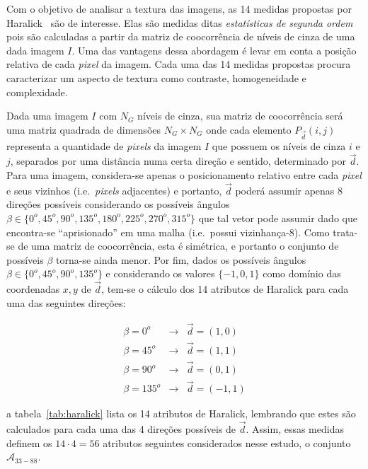 Com o objetivo de analisar a textura das imagens, as 14 medidas
propostas por Haralick~\cite{haralick} são de interesse. Elas são
medidas ditas \emph{estatísticas de segunda ordem} pois são calculadas
a partir da matriz de coocorrência de níveis de cinza de uma dada
imagem $I$. Uma das vantagens dessa abordagem é levar em conta a
posição relativa de cada \textit{pixel} da imagem. Cada uma das 14 medidas
propostas procura caracterizar um aspecto de textura como contraste,
homogeneidade e complexidade.

Dada uma imagem $I$ com $N_G$ níveis de cinza, sua matriz de
coocorrência será uma matriz quadrada de dimensões $N_G \times N_G$
onde cada elemento $P_{\vec{d}}(i,j)$ representa a quantidade
de \textit{pixels} da imagem $I$ que possuem os níveis de cinza $i$ e
$j$, separados por uma distância numa certa direção e sentido,
determinado por $\vec{d}$. Para uma imagem, considera-se apenas o
posicionamento relativo entre cada \textit{pixel} e seus vizinhos
(i.e.\ \textit{pixels} adjacentes) e portanto, $\vec{d}$ poderá
assumir apenas 8 direções possíveis considerando os possíveis ângulos
$\beta \in \{0^o, 45^o, 90^o, 135^o, 180^o, 225^o, 270^o, 315^o\}$ que
tal vetor pode assumir dado que encontra-se ``aprisionado'' em uma
malha (i.e.\ possui vizinhança-8). Como trata-se de uma matriz de
coocorrência, esta é simétrica, e portanto o conjunto de possíveis
$\beta$ torna-se ainda menor. Por fim, dados os possíveis ângulos
$\beta \in \{0^o, 45^o, 90^o, 135^o\}$ e considerando os valores
$\{-1, 0, 1\}$ como domínio das coordenadas $x,y$ de $\vec{d}$, tem-se
o cálculo dos 14 atributos de Haralick para cada uma das seguintes
direções:

\begin{eqnarray}
  \beta = 0^o & \to & \vec{d} = (1, 0) \\
  \beta = 45^o & \to & \vec{d} = (1, 1) \\
  \beta = 90^o & \to & \vec{d} = (0, 1) \\
  \beta = 135^o & \to & \vec{d} = (-1, 1)
\end{eqnarray}

\noindent a tabela~\ref{tab:haralick} lista os 14 atributos de Haralick,
lembrando que estes são calculados para cada uma das 4 direções possíveis de
$\vec{d}$. Assim, essas medidas definem os $14 \cdot 4 = 56$ atributos seguintes
considerados nesse estudo, o conjunto $\mathcal{A}_{33-88}$.

